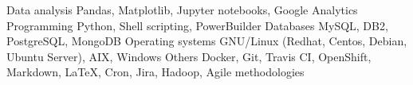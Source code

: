 %
%
%

    \begin{keywords}
        \keywordsentry
            {Data analysis}
            {
                Pandas,
                Matplotlib,
                Jupyter notebooks,
                Google Analytics
            }
        \keywordsentry
            {Programming}
            {
                Python,
                Shell scripting,
                PowerBuilder
            }
        \keywordsentry
            {Databases}
            {
                MySQL,
                DB2,
                PostgreSQL,
                MongoDB
            }
        \keywordsentry
            {Operating systems}
            {
                GNU/Linux (Redhat, Centos, Debian, Ubuntu Server),
                AIX,
                Windows
            }
        \keywordsentry
            {Others}
            {
            	Docker,
                Git,
                Travis CI,
                OpenShift,
                Markdown,
                \LaTeX,
                Cron,
                Jira,
                Hadoop,
                Agile methodologies
            }
    \end{keywords}
